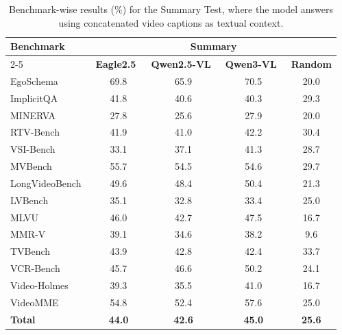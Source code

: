         \begin{table}[h]
        \centering
        \caption{Benchmark-wise results (\%) for the Summary Test, where the model answers using concatenated video captions as textual context.}
        \footnotesize
        \setlength{\tabcolsep}{4pt}
        \begin{tabular}{lcccc}
        \toprule
        \multirow{2}{*}{\textbf{Benchmark}} & \multicolumn{4}{c}{\scriptsize \textbf{Summary}} \\
        \cmidrule(lr){2-5}
         & {\scriptsize \textbf{Eagle2.5~\cite{eagle25}}} & {\scriptsize \textbf{Qwen2.5-VL}~\cite{qwen25vl}} & {\scriptsize \textbf{Qwen3-VL}~\cite{qwem3_vl}} & {\scriptsize \textbf{Random}} \\
        \midrule
        EgoSchema~\cite{egoschema} & 69.8 & 65.9 & 70.5 & 20.0 \\
        ImplicitQA~\cite{implicitqa} & 41.8 & 40.6 & 40.3 & 29.3 \\
        MINERVA~\cite{minerva} & 27.8 & 25.6 & 27.9 & 20.0 \\
        RTV-Bench~\cite{rtvbench} & 41.9 & 41.0 & 42.2 & 30.4 \\
        VSI-Bench~\cite{vsibench} & 33.1 & 37.1 & 41.3 & 28.7 \\
        MVBench~\cite{mvbench} & 55.7 & 54.5 & 54.6 & 29.7 \\
        LongVideoBench~\cite{longvideobench} & 49.6 & 48.4 & 50.4 & 21.3 \\
        LVBench~\cite{lvbench} & 35.1 & 32.8 & 33.4 & 25.0 \\
        MLVU~\cite{mlvu} & 46.0 & 42.7 & 47.5 & 16.7 \\
        MMR-V~\cite{mmrv} & 39.1 & 34.6 & 38.2 & 9.6 \\
        TVBench~\cite{tvbench} & 43.9 & 42.8 & 42.4 & 33.7 \\
        VCR-Bench~\cite{vcrbench} & 45.7 & 46.6 & 50.2 & 24.1 \\
        Video-Holmes~\cite{videoholmes} & 39.3 & 35.5 & 41.0 & 16.7 \\
        VideoMME~\cite{videomme} & 54.8 & 52.4 & 57.6 & 25.0 \\
        \midrule
        \textbf{Total} & \textbf{44.0} & \textbf{42.6} & \textbf{45.0} & \textbf{25.6} \\
        \bottomrule
        \end{tabular}
        \label{tab:narrative}
        \end{table}

